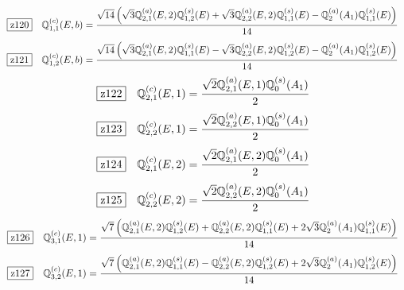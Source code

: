 \documentclass[fleqn,10pt,landscape]{jsarticle}
\begin{document}
\begin{dmath*}
\hspace*{3mm}\fbox{z120}\quad \mathbb{Q}_{1,1}^{(c)}(E,b)=\frac{\sqrt{14} \left(\sqrt{3} \mathbb{Q}_{2,1}^{(a)}(E,2) \mathbb{Q}_{1,2}^{(s)}(E) + \sqrt{3} \mathbb{Q}_{2,2}^{(a)}(E,2) \mathbb{Q}_{1,1}^{(s)}(E) - \mathbb{Q}_{2}^{(a)}(A_{1}) \mathbb{Q}_{1,1}^{(s)}(E)\right)}{14}
\end{dmath*}
\begin{dmath*}
\hspace*{3mm}\fbox{z121}\quad \mathbb{Q}_{1,2}^{(c)}(E,b)=\frac{\sqrt{14} \left(\sqrt{3} \mathbb{Q}_{2,1}^{(a)}(E,2) \mathbb{Q}_{1,1}^{(s)}(E) - \sqrt{3} \mathbb{Q}_{2,2}^{(a)}(E,2) \mathbb{Q}_{1,2}^{(s)}(E) - \mathbb{Q}_{2}^{(a)}(A_{1}) \mathbb{Q}_{1,2}^{(s)}(E)\right)}{14}
\end{dmath*}
\begin{dmath*}
\hspace*{3mm}\fbox{z122}\quad \mathbb{Q}_{2,1}^{(c)}(E,1)=\frac{\sqrt{2} \mathbb{Q}_{2,1}^{(a)}(E,1) \mathbb{Q}_{0}^{(s)}(A_{1})}{2}
\end{dmath*}
\begin{dmath*}
\hspace*{3mm}\fbox{z123}\quad \mathbb{Q}_{2,2}^{(c)}(E,1)=\frac{\sqrt{2} \mathbb{Q}_{2,2}^{(a)}(E,1) \mathbb{Q}_{0}^{(s)}(A_{1})}{2}
\end{dmath*}
\begin{dmath*}
\hspace*{3mm}\fbox{z124}\quad \mathbb{Q}_{2,1}^{(c)}(E,2)=\frac{\sqrt{2} \mathbb{Q}_{2,1}^{(a)}(E,2) \mathbb{Q}_{0}^{(s)}(A_{1})}{2}
\end{dmath*}
\begin{dmath*}
\hspace*{3mm}\fbox{z125}\quad \mathbb{Q}_{2,2}^{(c)}(E,2)=\frac{\sqrt{2} \mathbb{Q}_{2,2}^{(a)}(E,2) \mathbb{Q}_{0}^{(s)}(A_{1})}{2}
\end{dmath*}
\begin{dmath*}
\hspace*{3mm}\fbox{z126}\quad \mathbb{Q}_{3,1}^{(c)}(E,1)=\frac{\sqrt{7} \left(\mathbb{Q}_{2,1}^{(a)}(E,2) \mathbb{Q}_{1,2}^{(s)}(E) + \mathbb{Q}_{2,2}^{(a)}(E,2) \mathbb{Q}_{1,1}^{(s)}(E) + 2 \sqrt{3} \mathbb{Q}_{2}^{(a)}(A_{1}) \mathbb{Q}_{1,1}^{(s)}(E)\right)}{14}
\end{dmath*}
\begin{dmath*}
\hspace*{3mm}\fbox{z127}\quad \mathbb{Q}_{3,2}^{(c)}(E,1)=\frac{\sqrt{7} \left(\mathbb{Q}_{2,1}^{(a)}(E,2) \mathbb{Q}_{1,1}^{(s)}(E) - \mathbb{Q}_{2,2}^{(a)}(E,2) \mathbb{Q}_{1,2}^{(s)}(E) + 2 \sqrt{3} \mathbb{Q}_{2}^{(a)}(A_{1}) \mathbb{Q}_{1,2}^{(s)}(E)\right)}{14}
\end{dmath*}
\end{document}
